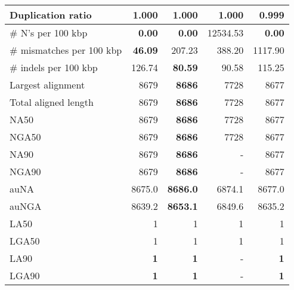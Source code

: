 \documentclass[12pt,a4paper]{article}
\begin{document}
\begin{table}[ht]
\begin{center}
\begin{tabular}{|l*{4}{|r}|}
Duplication ratio & 1.000 & 1.000 & 1.000 & {\bf 0.999} \\ \hline
\# N's per 100 kbp & {\bf 0.00} & {\bf 0.00} & 12534.53 & {\bf 0.00} \\ \hline
\# mismatches per 100 kbp & {\bf 46.09} & 207.23 & 388.20 & 1117.90 \\ \hline
\# indels per 100 kbp & 126.74 & {\bf 80.59} & 90.58 & 115.25 \\ \hline
Largest alignment & 8679 & {\bf 8686} & 7728 & 8677 \\ \hline
Total aligned length & 8679 & {\bf 8686} & 7728 & 8677 \\ \hline
NA50 & 8679 & {\bf 8686} & 7728 & 8677 \\ \hline
NGA50 & 8679 & {\bf 8686} & 7728 & 8677 \\ \hline
NA90 & 8679 & {\bf 8686} & - & 8677 \\ \hline
NGA90 & 8679 & {\bf 8686} & - & 8677 \\ \hline
auNA & 8675.0 & {\bf 8686.0} & 6874.1 & 8677.0 \\ \hline
auNGA & 8639.2 & {\bf 8653.1} & 6849.6 & 8635.2 \\ \hline
LA50 & 1 & 1 & 1 & 1 \\ \hline
LGA50 & 1 & 1 & 1 & 1 \\ \hline
LA90 & {\bf 1} & {\bf 1} & - & {\bf 1} \\ \hline
LGA90 & {\bf 1} & {\bf 1} & - & {\bf 1} \\ \hline
\end{tabular}
\end{center}
\end{table}
\end{document}
